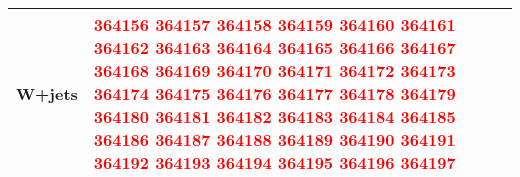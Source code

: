 {\begin{tabular}{|l|p{10cm}|}
W+jets & \textcolor{red}{364156} \textcolor{red}{364157} \textcolor{red}{364158} \textcolor{red}{364159} \textcolor{red}{364160} \textcolor{red}{364161} \textcolor{red}{364162} \textcolor{red}{364163} \textcolor{red}{364164} \textcolor{red}{364165} \textcolor{red}{364166} \textcolor{red}{364167} \textcolor{red}{364168} \textcolor{red}{364169} \textcolor{red}{364170} \textcolor{red}{364171} \textcolor{red}{364172} \textcolor{red}{364173} \textcolor{red}{364174} \textcolor{red}{364175} \textcolor{red}{364176} \textcolor{red}{364177} \textcolor{red}{364178} \textcolor{red}{364179} \textcolor{red}{364180} \textcolor{red}{364181} \textcolor{red}{364182} \textcolor{red}{364183} \textcolor{red}{364184} \textcolor{red}{364185} \textcolor{red}{364186} \textcolor{red}{364187} \textcolor{red}{364188} \textcolor{red}{364189} \textcolor{red}{364190} \textcolor{red}{364191} \textcolor{red}{364192} \textcolor{red}{364193} \textcolor{red}{364194} \textcolor{red}{364195} \textcolor{red}{364196} \textcolor{red}{364197} \\
\hline
\end{tabular}}
